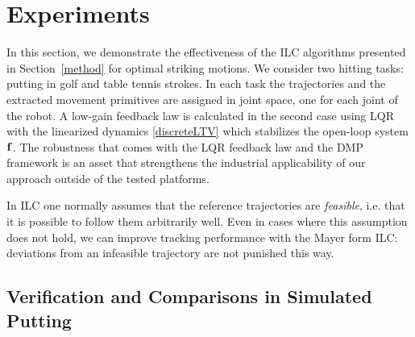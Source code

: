 \section{Experiments}\label{experiments}


In this section, we demonstrate the effectiveness of the ILC algorithms presented in Section~\ref{method} for optimal striking motions. We consider two hitting tasks: putting in golf and table tennis strokes. In each task the trajectories and the extracted movement primitives are assigned in joint space, one for each joint of the robot. A low-gain feedback law is calculated in the second case using LQR with the linearized dynamics \eqref{discreteLTV} which stabilizes the open-loop system $\boldsymbol{\mathrm{f}}$. The robustness that comes with the LQR feedback law and the DMP framework is an asset that strengthens the industrial applicability of our approach outside of the tested platforms.

In ILC one normally assumes that the reference trajectories are \emph{feasible}, i.e. that it is possible to follow them arbitrarily well. Even in cases where this assumption does not hold, we can improve tracking performance with the Mayer form ILC: deviations from an infeasible trajectory are not punished this way.

\subsection{Verification and Comparisons in Simulated Putting}


